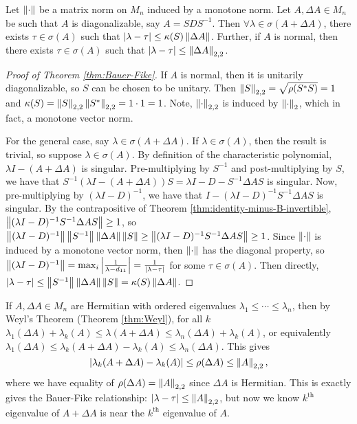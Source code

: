 \begin{theorem}
\label{thm:Bauer-Fike}
Let $\left\lVert\cdot\right\rVert$ be a matrix norm on $M_n$ induced by a monotone norm. Let $A, \Delta A \in M_n$ be such that $A$ is diagonalizable, say $A = SDS^{-1}$. Then $\forall \lambda \in \sigma(A+\Delta A)$, there exists $\tau \in \sigma(A)$ such that $|\lambda -\tau| \le \kappa(S)\left\lVert\Delta A\right\rVert$. Further, if $A$ is normal, then there exists $\tau \in \sigma(A)$ such that $|\lambda - \tau| \le \left\lVert\Delta A\right\rVert_{2,2}$.
\end{theorem}

\begin{proof}[Proof of Theorem \ref{thm:Bauer-Fike}]
If $A$ is normal, then it is unitarily diagonalizable, so $S$ can be chosen to be unitary. Then $\left\lVert S\right\rVert_{2,2} = \sqrt{\rho(S^*S)} = 1$ and $\kappa(S) = \left\lVert S\right\rVert_{2,2}\left\lVert S^*\right\rVert_{2,2} = 1\cdot1 = 1$. Note, $\left\lVert\cdot\right\rVert_{2,2}$ is induced by $\left\lVert\cdot\right\rVert_2$, which in fact, a monotone vector norm. 

For the general case, say $\lambda \in \sigma(A +\Delta A)$. If $\lambda \in \sigma(A)$, then the result is trivial, so suppose $\lambda \in \sigma(A)$. By definition of the characteristic polynomial, $\lambda I-(A+\Delta A)$ is singular. Pre-multiplying by $S^{-1}$ and post-multiplying by $S$, we have that $S^{-1}(\lambda I - (A + \Delta A))S = \lambda I - D-S^{-1}\Delta AS$ is singular. Now, pre-multiplying by $(\lambda I - D)^{-1}$, we have that $I - (\lambda I - D)^{-1}S^{-1}\Delta AS$ is singular. By the contrapositive of Theorem \ref{thm:identity-minus-B-invertible}, $\left\lVert(\lambda I - D)^{-1}S^{-1}\Delta AS\right\rVert \ge 1$, so $\left\lVert(\lambda I - D)^{-1}\right\rVert\left\lVert S^{-1}\right\rVert\left\lVert\Delta A\right\rVert\left\lVert S\right\rVert \ge \left\lVert(\lambda I - D)^{-1}S^{-1}\Delta AS\right\rVert \ge 1$. Since $\left\lVert\cdot\right\rVert$ is induced by a monotone vector norm, then $\left\lVert\cdot\right\rVert$ has the diagonal property, so $\left\lVert(\lambda I - D)^{-1}\right\rVert = \max_i \left|\frac{1}{\lambda - d_{11}}\right| = \frac{1}{|\lambda - \tau|}$ for some $\tau \in \sigma(A)$. Then directly, $|\lambda - \tau| \le \left\lVert S^{-1}\right\rVert\left\lVert\Delta A\right\rVert\left\lVert S\right\rVert = \kappa(S) \left\lVert\Delta A\right\rVert$.
\end{proof}

\begin{note*}
If $A, \Delta A \in M_n$ are Hermitian with ordered eigenvalues $\lambda_1 \le \cdots \le \lambda_n$, then by Weyl's Theorem (Theorem \ref{thm:Weyl}), for all $k$ $\lambda_1(\Delta A) + \lambda_k(A) \le \lambda(A+\Delta A) \le \lambda_n(\Delta A) + \lambda_k(A)$, or equivalently $\lambda_1(\Delta A) \le \lambda_k(A+\Delta A) - \lambda_k(A) \le \lambda_n(\Delta A)$. This gives
\[
    |\lambda_k(A+\Delta A) - \lambda_k(A)| \le \rho(\Delta A) \le \left\lVert A\right\rVert_{2,2},
\]
where we have equality of $\rho(\Delta A) = \left\lVert A\right\rVert_{2,2}$ since $\Delta A$ is Hermitian. This is exactly gives the Bauer-Fike relationship: $|\lambda - \tau| \le \left\lVert A\right\rVert_{2,2}$, but now we know $k^{\text{th}}$ eigenvalue of $A + \Delta A$ is near the $k^{\text{th}}$ eigenvalue of $A$.
\end{note*}